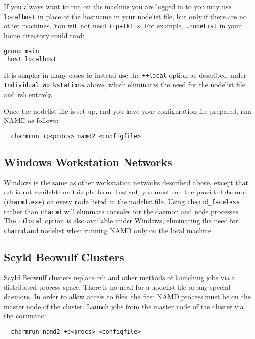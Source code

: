 If you always want to run on the machine you are logged in to you may
use \verb#localhost# in place of the hostname in your nodelist file, but
only if there are no other machines.  You will not need \verb#++pathfix#.
For example, \verb#.nodelist# in your home directory could read:

\begin{verbatim}
group main
 host localhost
\end{verbatim}

It is simpler in many cases to instead use the \verb#++local# option as
described under \verb#Individual Workstations# above, which eliminates the
need for the nodelist file and rsh entirely.

Once the nodelist file is set up, and you have your configuration file
prepared, run NAMD as follows:

\begin{verbatim}
  charmrun +p<procs> namd2 <configfile>
\end{verbatim}

\subsection{Windows Workstation Networks}

Windows is the same as other workstation networks described above,
except that rsh is not available on this platform.  Instead, you must
run the provided daemon (\verb#charmd.exe#) on every node listed in the
nodelist file.  Using \verb#charmd_faceless# rather than \verb#charmd# will eliminate
consoles for the daemon and node processes.  The \verb#++local# option is
also available under Windows, eliminating the need for \verb#charmd# and
nodelist when running NAMD only on the local machine.

\subsection{Scyld Beowulf Clusters}

Scyld Beowulf clusters replace rsh and other methods of launching jobs
via a distributed process space.  There is no need for a nodelist file
or any special daemons.  In order to allow access to files, the first
NAMD process must be on the master node of the cluster.  Launch jobs
from the master node of the cluster via the command:

\begin{verbatim}
  charmrun namd2 +p<procs> <configfile>
\end{verbatim}

